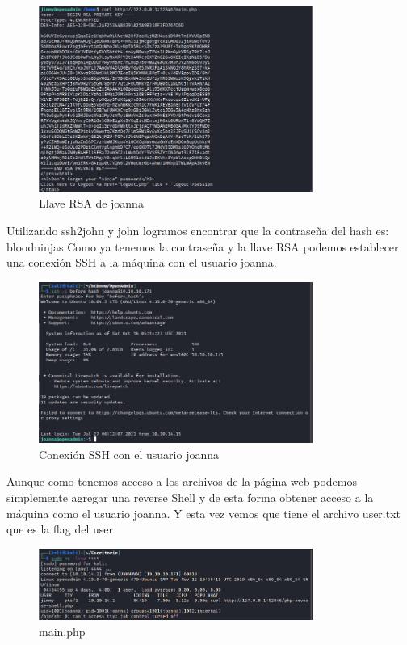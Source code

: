 \documentclass{article}
\begin{document}
\begin{figure}[h]
	\center
	\includegraphics[width=0.8\textwidth]{images/openadmin/15-joannarsa.png}
	\caption{Llave RSA de joanna}
\end{figure}

Utilizando ssh2john y john logramos encontrar que la contraseña del hash es: bloodninjas
Como ya tenemos la contraseña y la llave RSA podemos establecer una conexión SSH a la máquina con el usuario joanna.
\begin{figure}[h]
	\center
	\includegraphics[width=0.8\textwidth]{images/openadmin/16-sshjoanna.png}
	\caption{Conexión SSH con el usuario joanna}
\end{figure}

Aunque como tenemos acceso a los archivos de la página web podemos simplemente agregar una reverse Shell y de esta forma obtener acceso a la máquina como el usuario joanna. Y esta vez vemos que tiene el archivo user.txt que es la flag del user
\begin{figure}[h]
	\center
	\includegraphics[width=0.8\textwidth]{images/openadmin/17-alternativa.png}
	\caption{main.php}
\end{figure}
\end{document}
